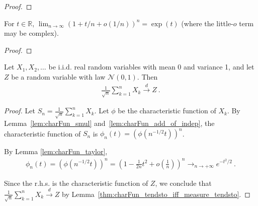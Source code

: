 \begin{proof}\leanok
{}
\end{proof}

\begin{lemma}\label{lem:tendsto_one_plus_div_pow_exp}
\leanok
{}
For $t\in\mathbb{R}$, $\lim_{n\to\infty}(1+t/n+o(1/n))^n=\exp(t)$ (where the little-$o$ term may be complex).
\end{lemma}

\begin{proof}\leanok
\end{proof}

\begin{theorem}\label{clt}
    \leanok
Let $X_1, X_2, \ldots$ be i.i.d. real random variables with mean 0 and variance 1, and let $Z$ be a random variable with law $\mathcal N(0,1)$. Then
\begin{align*}
\frac{1}{\sqrt{n}}\sum_{k=1}^n X_k \xrightarrow{d} Z \: .
\end{align*}
\end{theorem}

\begin{proof}
\leanok
Let $S_n = \frac{1}{\sqrt{n}}\sum_{k=1}^n X_k$. Let $\phi$ be the characteristic function of $X_k$. By Lemma~\ref{lem:charFun_smul} and~\ref{lem:charFun_add_of_indep}, the characteristic function of $S_n$ is $\phi_n(t) = (\phi(n^{-1/2}t))^n$.

By Lemma \ref{lem:charFun_taylor},
\begin{align*}
\phi_n(t) = (\phi(n^{-1/2}t))^n = \left(1 - \frac{1}{2n}t^2 + o(\frac{1}{n})\right)^n \to_{n \to +\infty} e^{-t^2/2} \: .
\end{align*}

Since the r.h.s. is the characteristic function of $Z$, we conclude that $\frac{1}{\sqrt{n}}\sum_{k=1}^n X_k \xrightarrow{d} Z$ by Lemma~\ref{thm:charFun_tendsto_iff_measure_tendsto}.
\end{proof}
